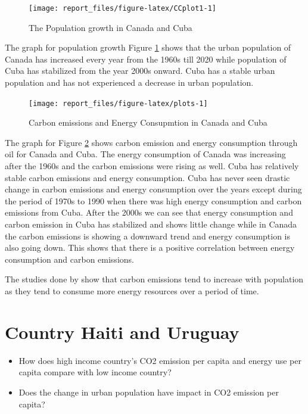 \documentclass[11pt,a4paper,]{article}
\begin{document}
\begin{figure}

{\centering \texttt{[image: report\_files/figure-latex/CCplot1-1]} 

}

\caption{The Population growth in Canada and Cuba}\label{fig:CCplot1}
\end{figure}

The graph for population growth Figure \ref{fig:CCplot1} shows that the urban population of Canada has increased every year from the 1960s till 2020 while population of Cuba has stabilized from the year 2000s onward. Cuba has a stable urban population and has not experienced a decrease in urban population.

\begin{figure}

{\centering \texttt{[image: report\_files/figure-latex/plots-1]} 

}

\caption{Carbon emissions and Energy Consupmtion in Canada and Cuba}\label{fig:plots}
\end{figure}

\newpage

The graph for Figure \ref{fig:plots} shows carbon emission and energy consumption through oil for Canada and Cuba. The energy consumption of Canada was increasing after the 1960s and the carbon emissions were rising as well. Cuba has relatively stable carbon emissions and energy consumption. Cuba has never seen drastic change in carbon emissions and energy consumption over the years except during the period of 1970s to 1990 when there was high energy consumption and carbon emissions from Cuba. After the 2000s we can see that energy consumption and carbon emission in Cuba has stabilized and shows little change while in Canada the carbon emissions is showing a downward trend and energy consumption is also going down. This shows that there is a positive correlation between energy consumption and carbon emissions.

The studies done by \textcite{o2010global} show that carbon emissions tend to increase with population as they tend to consume more energy resources over a period of time.

\section*{Country Haiti and Uruguay}

\begin{itemize}
\item
  How does high income country's CO2 emission per capita and energy use per capita compare with low income country?
\item
  Does the change in urban population have impact in CO2 emission per capita?
\end{itemize}
\end{document}
